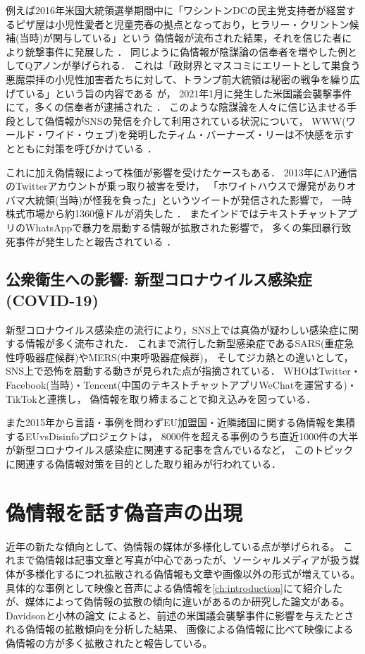 例えば2016年米国大統領選挙期間中に「ワシントンDCの民主党支持者が経営するピザ屋は小児性愛者と児童売春の拠点となっており，ヒラリー・クリントン候補(当時)が関与している」という
偽情報が流布された結果，それを信じた者により銃撃事件に発展した \cite{agencies_2016}．
同じように偽情報が陰謀論の信奉者を増やした例としてQアノンが挙げられる．
これは「政財界とマスコミにエリートとして巣食う悪魔崇拝の小児性加害者たちに対して、トランプ前大統領は秘密の戦争を繰り広げている」という旨の内容である \cite{wendling_2021}が，
2021年1月に発生した米国議会襲撃事件にて，多くの信奉者が逮捕された \cite{hymes_mcdonald_watson_2021}．
このような陰謀論を人々に信じ込ませる手段として偽情報がSNSの発信を介して利用されている状況について，
WWW(ワールド・ワイド・ウェブ)を発明したティム・バーナーズ・リーは不快感を示すとともに対策を呼びかけている \cite{reklaitis_2018}．

これに加え偽情報によって株価が影響を受けたケースもある．
2013年にAP通信のTwitterアカウントが乗っ取り被害を受け，
「ホワイトハウスで爆発がありオバマ大統領(当時)が怪我を負った」というツイートが発信された影響で，
一時株式市場から約1360億ドルが消失した \cite{fisher_2013}．
またインドではテキストチャットアプリのWhatsAppで暴力を扇動する情報が拡散された影響で，
多くの集団暴行致死事件が発生したと報告されている \cite{frayer_2018}．

\subsection{公衆衛生への影響: 新型コロナウイルス感染症(COVID-19)}
新型コロナウイルス感染症の流行により，SNS上では真偽が疑わしい感染症に関する情報が多く流布された．
これまで流行した新型感染症であるSARS(重症急性呼吸器症候群)やMERS(中東呼吸器症候群)，
そしてジカ熱との違いとして，SNS上で恐怖を扇動する動きが見られた点が指摘されている．
WHOはTwitter・Facebook(当時)・Tencent(中国のテキストチャットアプリWeChatを運営する)・TikTokと連携し，
偽情報を取り締まることで抑え込みを図っている\cite{hao_2020}．

また2015年から言語・事例を問わずEU加盟国・近隣諸国に関する偽情報を集積するEUvsDisinfoプロジェクト\cite{euvsdisinfo_2020}は，
8000件を超える事例のうち直近1000件の大半が新型コロナウイルス感染症に関連する記事を含んでいる\cite{euvsdisinfo_2020_2}など，
このトピックに関連する偽情報対策を目的とした取り組みが行われている．

\section{偽情報を話す偽音声の出現}
近年の新たな傾向として、偽情報の媒体が多様化している点が挙げられる。
これまで偽情報は記事文章と写真が中心であったが、ソーシャルメディアが扱う媒体が多様化するにつれ拡散される偽情報も文章や画像以外の形式が増えている。
具体的な事例として映像と音声による偽情報を\cref{ch:introduction}にて紹介したが、媒体によって偽情報の拡散の傾向に違いがあるのか研究した論文がある。
Davidsonと小林の論文 \cite{DAVIDSON2022107241}によると、前述の米国議会襲撃事件に影響を与えたとされる偽情報の拡散傾向を分析した結果、
画像による偽情報に比べて映像による偽情報の方が多く拡散されたと報告している。

